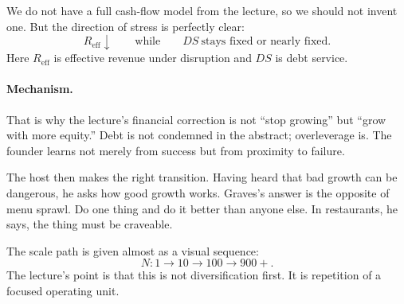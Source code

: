 We do not have a full cash-flow model from the lecture, so we should not invent one. But the direction of stress is perfectly clear:
\begin{equation}
R_{\mathrm{eff}}\downarrow
\qquad \text{while} \qquad
DS \ \text{stays fixed or nearly fixed.}
\end{equation}
Here \(R_{\mathrm{eff}}\) is effective revenue under disruption and \(DS\) is debt service.

\paragraph{Mechanism.}
That is why the lecture's financial correction is not ``stop growing'' but ``grow with more equity.'' Debt is not condemned in the abstract; overleverage is. The founder learns not merely from success but from proximity to failure.

The host then makes the right transition. Having heard that bad growth can be dangerous, he asks how good growth works. Graves's answer is the opposite of menu sprawl. Do one thing and do it better than anyone else. In restaurants, he says, the thing must be craveable.

The scale path is given almost as a visual sequence:
\begin{equation}
N: 1 \longrightarrow 10 \longrightarrow 100 \longrightarrow 900+.
\end{equation}
The lecture's point is that this is not diversification first. It is repetition of a focused operating unit.

\begin{figure}[h]
\centering
{}
\end{figure}

